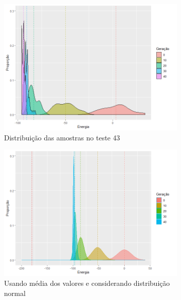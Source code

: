 \begin{figure}[ht]
	\centering
	\begin{subfigure}[b]{0.47\linewidth}
		\includegraphics[width=\linewidth]{imagens/distribuicao_t43_2.png}
		\caption{Distribuição das amostras no teste 43}
	\end{subfigure}
	\begin{subfigure}[b]{0.47\linewidth}
		\includegraphics[width=\linewidth]{imagens/Distribuicao_medias2.png}
		\caption{Usando média dos valores e considerando distribuição normal}
	\end{subfigure}
	\begin{subfigure}[b]{0.67\linewidth}

\end{subfigure}
\end{figure}
